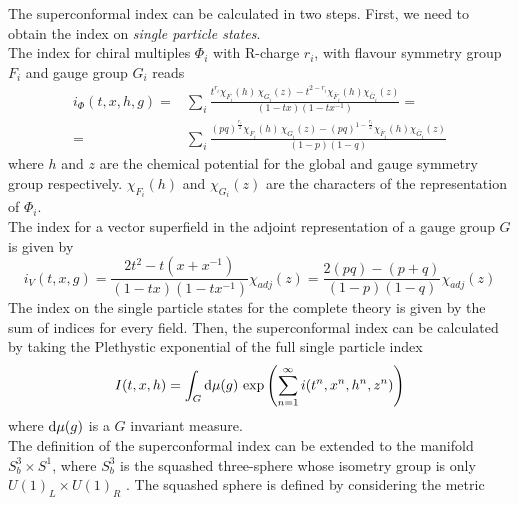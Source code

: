 The superconformal index can be calculated in two steps.
First, we need to obtain the index on \emph{single particle states}.\\
The index for chiral multiples $\Phi_i$ with R-charge $r_i$, with flavour symmetry group $F_i$ and gauge group $G_i$ reads \cite{Dolan:2008qi}
\begin{align}
i_{\Phi}(t,x,h,g) =&  \sum_{i} \frac{ t^{r_i} \chi_{F_i}(h) \, \chi_{G_i}(z) - t^{2-r_i} \chi_{\bar{F}_i}(h) \chi_{\bar{G}_i}(z)}{ (1-tx) (1- t x^{-1})} = \\
=& \sum_{i} \frac{ (pq)^{\frac{r_i}{2}} \chi_{F_i}(h) \, \chi_{G_i}(z) - (pq)^{1-\frac{r_i}{2}} \chi_{\bar{F}_i}(h) \chi_{\bar{G}_i}(z)}{ (1-p) (1- q)} 
\label{eqn:superconforma_index_chiral}
\end{align}
where $h$ and $z$ are the chemical potential for the global and gauge symmetry group respectively. $\chi_{F_i}(h)$ and $\chi_{G_i}(z)$ are the characters of the representation of $\Phi_i$.\\
The index for a vector superfield in the adjoint representation of a gauge group $G$ is given by \cite{Dolan:2008qi}
\begin{equation}
i_{V} (t,x,g) = \frac{2 t^2 - t(x + x^{-1})}{(1-tx) (1 - tx^{-1})} \chi_{adj}(z) =  \frac{2 (pq) - (p+q )}{(1-p) (1 - q)} \chi_{adj}(z)
\label{eqn:superconformal_index_vector}
\end{equation}
The index on the single particle states for the complete theory is given by the sum of indices for every field. 
Then, the superconformal index can be calculated by taking the Plethystic exponential \cite{Feng:2007ur} of the full single particle index
\begin{equation}
  I(t,x,h) = \int_{G} \hbox{d} \mu(g)\,  \exp{ \left(  \sum_{n=1}^{\infty}i(t^n,x^n,h^n,z^n) \right)}
  \end{equation}  
where $\hbox{d} \mu(g)$ is a $G$ invariant measure.\\
The definition of the superconformal index can be extended to the manifold $S_b^3 \times S^1$, where $S_b^3$ is the squashed three-sphere whose isometry group is only $U(1)_L \times U(1)_R$ \cite{Hama:2011ea}.
The squashed sphere is defined by considering the metric 
